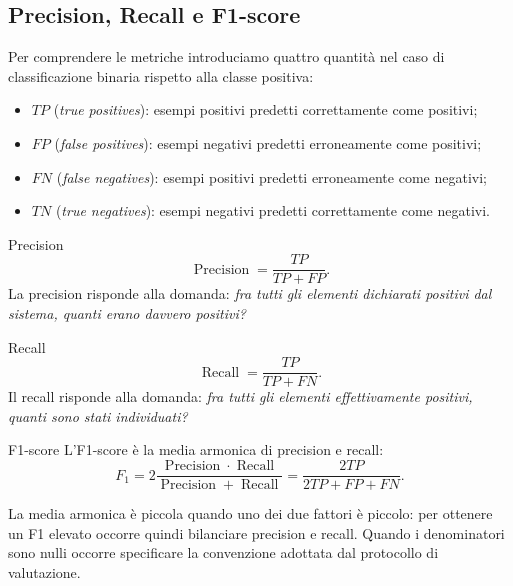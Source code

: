 \subsection{Precision, Recall e F1-score}

Per comprendere le metriche introduciamo quattro quantità nel caso di classificazione binaria rispetto alla classe positiva:
\begin{itemize}
\item $TP$ (\emph{true positives}): esempi positivi predetti correttamente come positivi;
\item $FP$ (\emph{false positives}): esempi negativi predetti erroneamente come positivi;
\item $FN$ (\emph{false negatives}): esempi positivi predetti erroneamente come negativi;
\item $TN$ (\emph{true negatives}): esempi negativi predetti correttamente come negativi.
\end{itemize}

\begin{definition}{Precision}
\begin{equation}
\boxed{\operatorname{Precision}=\frac{TP}{TP+FP}}.
\end{equation}
La precision risponde alla domanda: \emph{fra tutti gli elementi dichiarati positivi dal sistema, quanti erano davvero positivi?}
\end{definition}

\begin{definition}{Recall}
\begin{equation}
\boxed{\operatorname{Recall}=\frac{TP}{TP+FN}}.
\end{equation}
Il recall risponde alla domanda: \emph{fra tutti gli elementi effettivamente positivi, quanti sono stati individuati?}
\end{definition}

\begin{definition}{F1-score}
L'F1-score è la media armonica di precision e recall:
\begin{equation}
\boxed{F_1=2\frac{\operatorname{Precision}\cdot\operatorname{Recall}}{\operatorname{Precision}+\operatorname{Recall}}}
=\frac{2TP}{2TP+FP+FN}.
\end{equation}
\end{definition}

La media armonica è piccola quando uno dei due fattori è piccolo: per ottenere un F1 elevato occorre quindi bilanciare precision e recall. Quando i denominatori sono nulli occorre specificare la convenzione adottata dal protocollo di valutazione.

